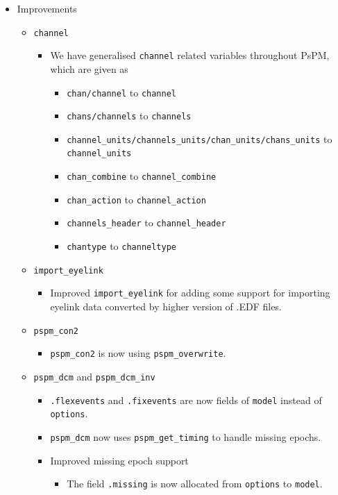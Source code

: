 \documentclass[english]{article}
\numberwithin{equation}{section}
\numberwithin{figure}{section}
\begin{document}
\begin{itemize}
    \item Improvements
    \begin{itemize}
    	\item \texttt{channel}
    	\begin{itemize}
    		\item We have generalised \texttt{channel} related variables throughout PsPM, which are given as 
    		\begin{itemize}
    			\item \texttt{chan/channel} to \texttt{channel}
    			\item \texttt{chans/channels} to \texttt{channels}
    			\item \texttt{channel\_units/channels\_units/chan\_units/chans\_units} to \texttt{channel\_units}
    			\item \texttt{chan\_combine} to \texttt{channel\_combine}
    			\item \texttt{chan\_action} to \texttt{channel\_action}
    			\item \texttt{channels\_header} to \texttt{channel\_header}
    			\item \texttt{chantype} to \texttt{channeltype}
    		\end{itemize}
			\end{itemize}
    	\item \texttt{import\_eyelink}
    	\begin{itemize}
    		\item Improved \texttt{import\_eyelink} for adding some support for importing eyelink data converted by higher version of .EDF files.
    	\end{itemize}
    	\item \texttt{pspm\_con2}
    	\begin{itemize}
    		\item \texttt{pspm\_con2} is now using \texttt{pspm\_overwrite}.
    	\end{itemize}
    	\item \texttt{pspm\_dcm} and \texttt{pspm\_dcm\_inv}
    	\begin{itemize}
    		\item \texttt{.flexevents} and \texttt{.fixevents} are now fields of \texttt{model} instead of \texttt{options}.
    		\item \texttt{pspm\_dcm} now uses \texttt{pspm\_get\_timing} to handle missing epochs.
    		\item Improved missing epoch support
    		\begin{itemize}
    			\item The field \texttt{.missing} is now allocated from \texttt{options} to \texttt{model}.

\end{itemize}
\end{itemize}
\end{itemize}
\end{itemize}
\end{document}
